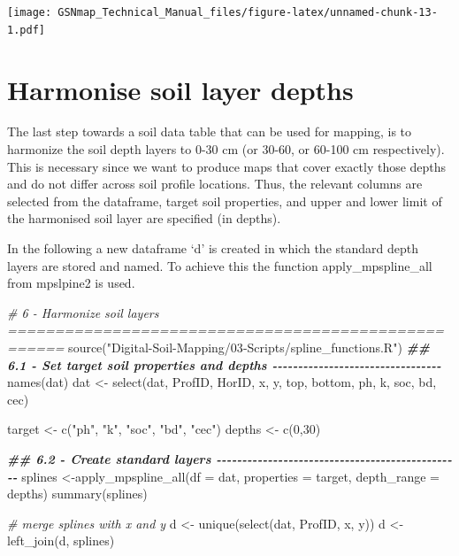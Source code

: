 \documentclass[
  10pt,
  b5paper,
  oneside]{book}
\newenvironment{Shaded}{\begin{snugshade}}{\end{snugshade}}
\newcommand{\AttributeTok}[1]{\textcolor[rgb]{0.77,0.63,0.00}{#1}}
\newcommand{\CommentTok}[1]{\textcolor[rgb]{0.56,0.35,0.01}{\textit{#1}}}
\newcommand{\DecValTok}[1]{\textcolor[rgb]{0.00,0.00,0.81}{#1}}
\newcommand{\DocumentationTok}[1]{\textcolor[rgb]{0.56,0.35,0.01}{\textbf{\textit{#1}}}}
\newcommand{\FunctionTok}[1]{\textcolor[rgb]{0.00,0.00,0.00}{#1}}
\newcommand{\NormalTok}[1]{#1}
\newcommand{\OtherTok}[1]{\textcolor[rgb]{0.56,0.35,0.01}{#1}}
\newcommand{\StringTok}[1]{\textcolor[rgb]{0.31,0.60,0.02}{#1}}
\begin{document}
\texttt{[image: GSNmap\_Technical\_Manual\_files/figure-latex/unnamed-chunk-13-1.pdf]}

\hypertarget{harmonise-soil-layer-depths}{%
\section{Harmonise soil layer depths}\label{harmonise-soil-layer-depths}}

The last step towards a soil data table that can be used for mapping, is to harmonize the soil depth layers to 0-30 cm (or 30-60, or 60-100 cm respectively). This is necessary since we want to produce maps that cover exactly those depths and do not differ across soil profile locations. Thus, the relevant columns are selected from the dataframe, target soil properties, and upper and lower limit of the harmonised soil layer are specified (in depths).

In the following a new dataframe `d' is created in which the standard depth layers are stored and named. To achieve this the function apply\_mpspline\_all from mpslpine2 is used.

\begin{Shaded}
\begin{Highlighting}[]
\CommentTok{\# 6 {-} Harmonize soil layers ====================================================}
\FunctionTok{source}\NormalTok{(}\StringTok{"Digital{-}Soil{-}Mapping/03{-}Scripts/spline\_functions.R"}\NormalTok{) }
\DocumentationTok{\#\# 6.1 {-} Set target soil properties and depths {-}{-}{-}{-}{-}{-}{-}{-}{-}{-}{-}{-}{-}{-}{-}{-}{-}{-}{-}{-}{-}{-}{-}{-}{-}{-}{-}{-}{-}{-}{-}{-}{-}}
\FunctionTok{names}\NormalTok{(dat)}
\NormalTok{dat }\OtherTok{\textless{}{-}} \FunctionTok{select}\NormalTok{(dat, ProfID, HorID, x, y, top, bottom, ph, k, soc, bd, cec)}

\NormalTok{target }\OtherTok{\textless{}{-}} \FunctionTok{c}\NormalTok{(}\StringTok{"ph"}\NormalTok{, }\StringTok{"k"}\NormalTok{, }\StringTok{"soc"}\NormalTok{,  }\StringTok{"bd"}\NormalTok{, }\StringTok{"cec"}\NormalTok{)}
\NormalTok{depths }\OtherTok{\textless{}{-}} \FunctionTok{c}\NormalTok{(}\DecValTok{0}\NormalTok{,}\DecValTok{30}\NormalTok{)}

\DocumentationTok{\#\# 6.2 {-} Create standard layers {-}{-}{-}{-}{-}{-}{-}{-}{-}{-}{-}{-}{-}{-}{-}{-}{-}{-}{-}{-}{-}{-}{-}{-}{-}{-}{-}{-}{-}{-}{-}{-}{-}{-}{-}{-}{-}{-}{-}{-}{-}{-}{-}{-}{-}{-}{-}{-}}
\NormalTok{splines }\OtherTok{\textless{}{-}}\FunctionTok{apply\_mpspline\_all}\NormalTok{(}\AttributeTok{df =}\NormalTok{ dat, }\AttributeTok{properties =}\NormalTok{ target, }\AttributeTok{depth\_range =}\NormalTok{ depths)}
\FunctionTok{summary}\NormalTok{(splines)}

\CommentTok{\# merge splines with x and y}
\NormalTok{d }\OtherTok{\textless{}{-}} \FunctionTok{unique}\NormalTok{(}\FunctionTok{select}\NormalTok{(dat, ProfID, x, y))}
\NormalTok{d }\OtherTok{\textless{}{-}} \FunctionTok{left\_join}\NormalTok{(d, splines)}
\end{Highlighting}
\end{Shaded}
\end{document}
